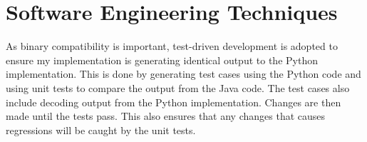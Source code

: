 \documentclass[final,dissertation.tex]{subfiles}
\begin{document}
\section{Software Engineering Techniques}

As binary compatibility is important, test-driven development is adopted to ensure my implementation is generating identical output to the Python implementation. This is done by generating test cases using the Python code and using unit tests to compare the output from the Java code. The test cases also include decoding output from the Python implementation. Changes are then made until the tests pass. This also ensures that any changes that causes regressions will be caught by the unit tests.
\end{document}
